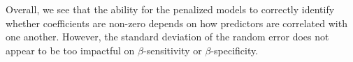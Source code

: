\documentclass{article}
\begin{document}
	Overall, we see that the ability for the penalized models to correctly identify whether coefficients are non-zero depends on how predictors are correlated with one another. However, the standard deviation of the random error does not appear to be too impactful on $\beta$-sensitivity or $\beta$-specificity.
	
	
	
\end{document}
